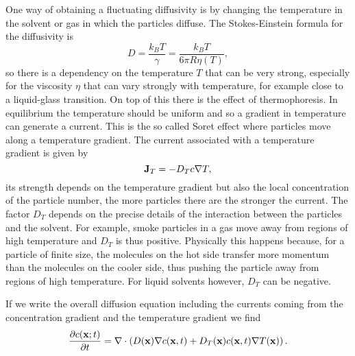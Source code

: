 \documentclass[11pt]{report}
\begin{document}
One way of obtaining a fluctuating diffusivity is by changing the temperature in the solvent or gas in which the particles diffuse. The Stokes-Einstein formula for the diffusivity is
\begin{equation}
D= \frac{k_BT}{\gamma} = \frac{k_BT}{6\pi R \eta(T)},
\end{equation}
so there is a dependency on the temperature $T$ that can be very strong, especially for the 
viscosity $\eta$ that can vary strongly with temperature, for example close to a liquid-glass transition. On top of this there is the effect of thermophoresis. In equilibrium the temperature should be uniform and so a gradient in temperature can generate a current. This is the so called Soret effect where particles move along a temperature gradient. The current associated with a temperature gradient is given by
\begin{equation}
{\bf J}_T = -D_T c\nabla T,
\end{equation}
its strength depends on the temperature gradient but also the local concentration of the particle number, the more particles there are the stronger the current. The factor $D_T$ depends on the precise details of the interaction between the particles and the solvent. For example, smoke particles in a gas move away from regions of high temperature and $D_T$ is thus positive. Physically this happens because, for a particle of finite size, the molecules on the hot side transfer more momentum than the molecules on the cooler side, thus pushing the particle away from regions of high temperature.  For liquid solvents however,  $D_T$ can be negative.

If we write the overall 
diffusion equation including the currents coming from the concentration gradient and the temperature gradient we find
\begin{equation}
{\partial c({\bf x};t)\over \partial t} = \nabla \cdot\left(D({\bf x})\nabla c({\bf x},t) + D_T({\bf x}) c({\bf x},t) \nabla T({\bf x})\right).
\end{equation}
\end{document}

